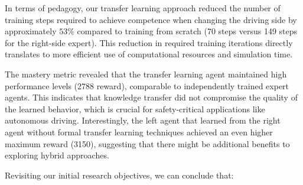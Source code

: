 In terms of pedagogy, our transfer learning approach reduced the number of training steps required to achieve competence when changing the driving side by approximately $53\%$ compared to training from scratch (70 steps versus 149 steps for the right-side expert). This reduction in required training iterations directly translates to more efficient use of computational resources and simulation time.

The mastery metric revealed that the transfer learning agent maintained high performance levels (2788 reward), comparable to independently trained expert agents. This indicates that knowledge transfer did not compromise the quality of the learned behavior, which is crucial for safety-critical applications like autonomous driving. Interestingly, the left agent that learned from the right agent without formal transfer learning techniques achieved an even higher maximum reward (3150), suggesting that there might be additional benefits to exploring hybrid approaches.

Revisiting our initial research objectives, we can conclude that:

